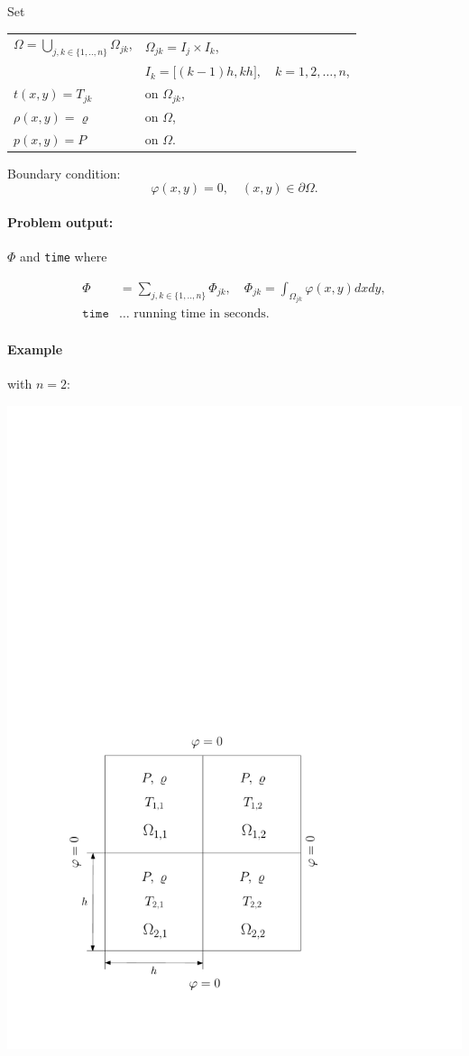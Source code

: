 \documentclass{article}
\begin{document}
Set
\begin{center}
   \begin{tabular}{ll}
  
  		$\Omega = \bigcup_{j,k\in \{1,..,n\}} \Omega_{jk}$,   &$\Omega_{jk} = I_j \times I_k$,\\
  		& $I_k = \bigl[ (k-1)h, kh  \bigr],  \quad k=1,2, \ldots, n$,\\
        $t(x,y) = T_{jk}$ & on $\Omega_{jk}$,\\
        $\rho(x,y) = \varrho$ & on $\Omega$,\\
        $p(x,y) = P$ & on $\Omega$.\\
   \end{tabular}
  \end{center}


Boundary condition:
  $$
  \varphi(x,y) = 0, \quad (x,y)\in \partial \Omega.
  $$
  
  \paragraph{Problem output:} $\Phi$ and \texttt{time} where
 
 \begin{align*}		
    \Phi &= \sum_{j,k\in \{1,..,n\}}\Phi_{jk}, \quad \Phi_{jk}=\int_{\Omega_{jk}}\varphi(x,y)dxdy,\\
    \texttt{time}& \ldots \mbox{ running time in seconds.}
  \end{align*}
  
 \paragraph{Example} with $n = 2$:\\[.5em]
 \begin{center}
 \includegraphics[scale=.6]{geometry}
 \end{center}
\end{document}
